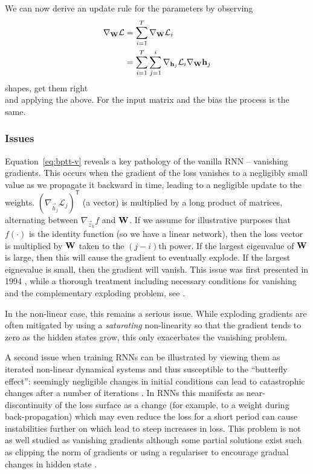 We can now derive an update rule for the parameters by observing
\begin{align}
	\nabla_{\mathbf{W}} \mathcal{L} &= \sum_{i=1}^T \nabla_{\mathbf{W}} \mathcal{L}_i \\
	&= \sum_{i=1}^T\sum_{j=1}^i\nabla_{\mathbf{h}_j} \mathcal{L}_i \nabla_{\mathbf{W}} \mathbf{h}_j
\end{align} 
{\Large shapes, get them right}\\
and applying the above. For the input matrix and the bias the process is the same.

\subsubsection{Issues}
Equation~\eqref{eq:bptt-v} reveals a key pathology of the vanilla RNN -- vanishing gradients.
This occurs when the gradient of the loss vanishes to a negligibly small value as we
propagate it backward in time, leading to a negligible update to the weights.
 \((\nabla_{\vec{h}_j}\mathcal{L}_j)^\mathsf{T}\) (a vector) is multiplied by a long product of
 matrices, alternating between \(\nabla_{\vec{z}_k} f\) and \(\mathbf{W}\). If we assume for
 illustrative purposes that \(f(\cdot)\) is the identity function (so we have a linear network),
then the loss vector is multiplied by \(\mathbf{W}\) taken to the \((j-i)\)th power. If the largest
eigenvalue of \(\mathbf{W}\) is large, then this will cause the gradient to eventually explode.
If the largest eignevalue is small, then the gradient will vanish. This issue was first presented
in 1994 \autocite{Bengio1994}, while a thorough treatment including necessary conditions 
for vanishing and the complementary exploding problem, see \autocite{Pascanu2012}.

In the non-linear case, this remains a serious issue. While exploding gradients are often
mitigated by using a \emph{saturating} non-linearity so that the gradient tends to zero as the
hidden states grow, this only exacerbates the vanishing problem. 

A second issue when training RNNs can be illustrated by viewing them as iterated non-linear
dynamical systems and thus susceptible to the ``butterfly effect'': seemingly negligible changes
in initial conditions can lead to catastrophic changes after a number of iterations
\autocite{Lorenz1963}. In RNNs this manifests as near-discontinuity of the loss surface
\autocite{Pascanu2012} as a change (for example, to a weight during back-propagation) which may
even reduce the loss for a short period can cause instabilities further on which lead to steep
increases in loss. This problem is not as well studied as vanishing gradients although some
partial solutions exist such as clipping the norm of gradients \autocite{Pascanu2012} or
using a regulariser to encourage gradual changes in hidden state \autocite{Krueger2016}.

